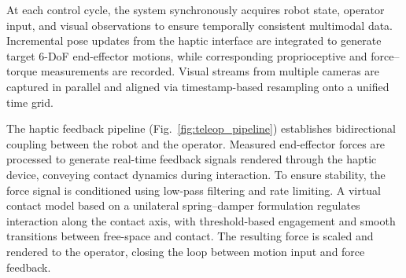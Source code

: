 \documentclass[letterpaper, 10 pt, conference]{ieeeconf}  %
\begin{document}
At each control cycle, the system synchronously acquires robot state, operator input, and visual observations to ensure temporally consistent multimodal data. Incremental pose updates from the haptic interface are integrated to generate target 6-DoF end-effector motions, while corresponding proprioceptive and force–torque measurements are recorded. Visual streams from multiple cameras are captured in parallel and aligned via timestamp-based resampling onto a unified time grid.



The haptic feedback pipeline (Fig.~\ref{fig:teleop_pipeline}) establishes bidirectional coupling between the robot and the operator. Measured end-effector forces are processed to generate real-time feedback signals rendered through the haptic device, conveying contact dynamics during interaction. To ensure stability, the force signal is conditioned using low-pass filtering and rate limiting. A virtual contact model based on a unilateral spring–damper formulation regulates interaction along the contact axis, with threshold-based engagement and smooth transitions between free-space and contact. The resulting force is scaled and rendered to the operator, closing the loop between motion input and force feedback.
\end{document}
